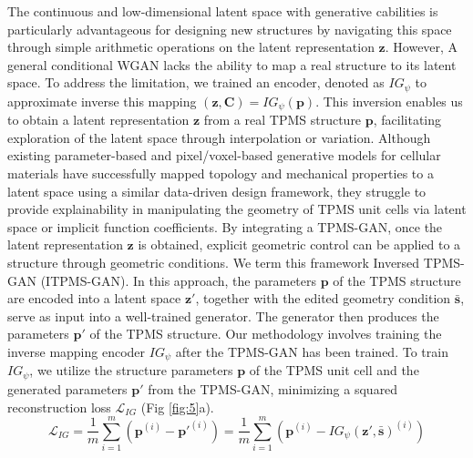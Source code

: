 \documentclass[preprint,review,12pt,authoryear]{elsarticle}
\begin{document}
The continuous and low-dimensional latent space with generative cabilities is particularly advantageous for designing new structures by navigating this space through simple arithmetic operations on the latent representation $\boldsymbol{z}$. However, A general conditional WGAN lacks the ability to map a real structure to its latent space. To address the limitation, we trained an encoder, denoted as $IG_\psi$ to approximate inverse this mapping $(\boldsymbol{z},\boldsymbol{C})=IG_\psi(\boldsymbol{p})$. This inversion enables us to obtain a latent representation $\boldsymbol{z}$ from a real TPMS structure $\boldsymbol{p}$, facilitating exploration of the latent space through interpolation or variation. Although existing parameter-based and pixel/voxel-based generative models for cellular materials have successfully mapped topology and mechanical properties to a latent space using a similar data-driven design framework, they struggle to provide explainability in manipulating the geometry of TPMS unit cells via latent space or implicit function coefficients. By integrating a TPMS-GAN, once the latent representation $\boldsymbol{z}$ is obtained, explicit geometric control can be applied to a structure through geometric conditions. We term this framework Inversed TPMS-GAN (ITPMS-GAN). In this approach, the parameters $\boldsymbol{p}$ of the TPMS structure are encoded into a latent space $\boldsymbol{z}'$, together with the edited geometry condition $\bar{\boldsymbol{s}}$, serve as input into a well-trained generator. The generator then produces the parameters $\boldsymbol{p}'$ of the TPMS structure. Our methodology involves training the inverse mapping encoder $IG_\psi$ after the TPMS-GAN has been trained. To train $IG_\psi$, we utilize the structure parameters $\boldsymbol{p}$ of the TPMS unit cell and the generated parameters $\boldsymbol{p}'$ from the TPMS-GAN, minimizing a squared reconstruction loss $\mathcal{L}_{IG}$ (Fig \ref{fig:5}a).
\begin{equation}
    \mathcal{L}_{IG} = \frac{1}{m}\sum_{i=1}^m(\boldsymbol{p}^{(i)}-\boldsymbol{p}'^{(i)})= \frac{1}{m}\sum_{i=1}^m(\boldsymbol{p}^{(i)}-IG_\psi(\boldsymbol{z}',\bar{\boldsymbol{s}})^{(i)})
\label{eq:21}
\end{equation}
\end{document}
